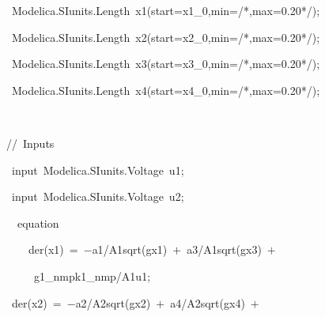 {{\hlstd \ Modelica.SIunits.Length\ x1}{\hlopt (}{\hlstd start}{\hlopt $\mathord{=}$}{\hlstd x1\_{}0}{\hlopt ,}{\hlstd min}{\hlopt $\mathord{=}$}{\hlstd }{}{\hlstd }{\hlcom /*,max$\mathord{=}$0.20*/}{\hlstd }{\hlopt );}\leavevmode\par
{\hlstd \ Modelica.SIunits.Length\ x2}{\hlopt (}{\hlstd start}{\hlopt $\mathord{=}$}{\hlstd x2\_{}0}{\hlopt ,}{\hlstd min}{\hlopt $\mathord{=}$}{\hlstd }{}{\hlstd }{\hlcom /*,max$\mathord{=}$0.20*/}{\hlstd }{\hlopt );}\leavevmode\par
{\hlstd \ Modelica.SIunits.Length\ x3}{\hlopt (}{\hlstd start}{\hlopt $\mathord{=}$}{\hlstd x3\_{}0}{\hlopt ,}{\hlstd min}{\hlopt $\mathord{=}$}{\hlstd }{}{\hlstd }{\hlcom /*,max$\mathord{=}$0.20*/}{\hlstd }{\hlopt );}\leavevmode\par
{\hlstd \ Modelica.SIunits.Length\ x4}{\hlopt (}{\hlstd start}{\hlopt $\mathord{=}$}{\hlstd x4\_{}0}{\hlopt ,}{\hlstd min}{\hlopt $\mathord{=}$}{\hlstd }{}{\hlstd }{\hlcom /*,max$\mathord{=}$0.20*/}{\hlstd }{\hlopt );}\leavevmode\par
{\hlstd \leavevmode\par
\ }{\hlslc //\ Inputs}\leavevmode\par
{\hlstd \ }{\hlkwa input\ }{\hlstd Modelica.SIunits.Voltage\ u1}{\hlopt ;}\leavevmode\par
{\hlstd \ }{\hlkwa input\ }{\hlstd Modelica.SIunits.Voltage\ u2}{\hlopt ;}\leavevmode\par
{\hlstd \leavevmode\par
}{\hlstd\ \ }{\hlstd }{\hlkwa equation}\leavevmode\par
{\hlstd }{\hlstd\ \ \ \ }{\hlstd }{\hlkwb der}{\hlstd }{\hlopt (}{\hlstd x1}{\hlopt )\ $\mathord{=}$\ $\mathord{-}$}{\hlstd a1}{\hlopt /}{\hlstd A1}{\hlopt *}{\hlstd sqrt}{\hlopt (}{\hlstd }{}{\hlstd }{\hlopt *}{\hlstd g}{\hlopt *}{\hlstd x1}{\hlopt )\ $\mathord{+}$\ }{\hlstd a3}{\hlopt /}{\hlstd A1}{\hlopt *}{\hlstd sqrt}{\hlopt (}{\hlstd }{}{\hlstd }{\hlopt *}{\hlstd g}{\hlopt *}{\hlstd x3}{\hlopt )\ $\mathord{+}$}\leavevmode\par
{\hlstd }{\hlstd\ \ \ \ \ }{\hlstd g1\_{}nmp}{\hlopt *}{\hlstd k1\_{}nmp}{\hlopt /}{\hlstd A1}{\hlopt *}{\hlstd u1}{\hlopt ;}\leavevmode\par
{\hlstd \ }{\hlkwb der}{\hlstd }{\hlopt (}{\hlstd x2}{\hlopt )\ $\mathord{=}$\ $\mathord{-}$}{\hlstd a2}{\hlopt /}{\hlstd A2}{\hlopt *}{\hlstd sqrt}{\hlopt (}{\hlstd }{}{\hlstd }{\hlopt *}{\hlstd g}{\hlopt *}{\hlstd x2}{\hlopt )\ $\mathord{+}$\ }{\hlstd a4}{\hlopt /}{\hlstd A2}{\hlopt *}{\hlstd sqrt}{\hlopt (}{\hlstd }{}{\hlstd }{\hlopt *}{\hlstd g}{\hlopt *}{\hlstd x4}{\hlopt )\ $\mathord{+}$}\leavevmode\par
}
